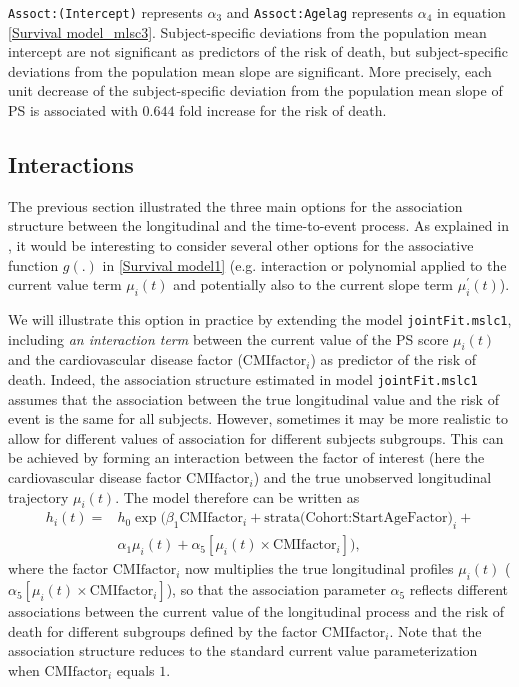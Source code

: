 \documentclass[12pt]{article}
\begin{document}
\texttt{Assoct:(Intercept)} represents $\alpha_3$ and \texttt{Assoct:Agelag} represents $\alpha_4$ in equation \eqref{Survival model_mlsc3}. Subject-specific deviations from the population mean intercept are not significant as predictors of the risk of death, but subject-specific deviations from the population mean slope are significant. More precisely, each unit decrease of the subject-specific deviation from the population mean slope of PS is associated with $0.644$ fold increase for the risk of death.

\subsection{Interactions}
\label{interaction}
The previous section illustrated the three main options for the association structure between the longitudinal and the time-to-event process. As explained in \cite{JMbayes}, it would be interesting to consider several other options for the associative function $g(.)$ in \eqref{Survival model1} (e.g. interaction or polynomial applied to the current value term $\mu_i(t)$ and
potentially also to the current slope term $\mu_i^{'}(t)$).

We will illustrate this option in practice by extending the model \texttt{jointFit.mslc1}, including \textit{an interaction term} between the current value of the PS score $\mu_i(t)$ and the cardiovascular disease factor ($\text{CMIfactor}_i$) as predictor of the risk of death. Indeed, the association structure estimated in model \texttt{jointFit.mslc1} assumes that the association between the true longitudinal value and the risk of event is the same for all subjects. However, sometimes it may be more realistic to allow for different values of association for different subjects subgroups. This can be achieved by forming an interaction between the factor of interest (here the cardiovascular disease factor $\text{CMIfactor}_i$) and the true unobserved longitudinal trajectory $\mu_i(t)$. The model therefore can be written as
\begin{equation}
\begin{split}
h_i(t) = &h_0 \exp \big(\beta_1 \text{CMIfactor}_i + \text{strata(Cohort:StartAgeFactor)}_i  + \\
& \alpha_1 \mu_i(t)  + \alpha_5 [\mu_i(t) \times \text{CMIfactor}_i ] \big),
\end{split}
\label{Survival model_mlsc4}
\end{equation}
where the factor $\text{CMIfactor}_i$ now multiplies the true longitudinal profiles $\mu_i(t)$ ($\alpha_5 [\mu_i(t) \times \text{CMIfactor}_i ]$), so that the association parameter $ \alpha_5$ reflects different associations between the current value of the longitudinal process and the risk of death for different subgroups defined by the factor $\text{CMIfactor}_i$. Note that the association structure reduces to the standard current value parameterization when $\text{CMIfactor}_i$ equals $1$.
\end{document}
